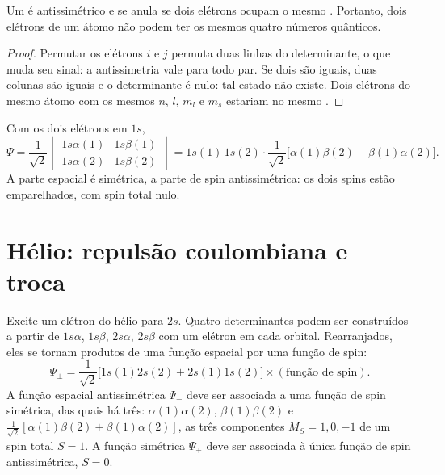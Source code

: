 \begin{theorem}\label{thm:b3:many-electron-atoms:pauli}
Um  é antissimétrico e se anula se dois elétrons
ocupam o mesmo . Portanto, dois elétrons de um átomo não podem
ter os mesmos quatro números quânticos.
\end{theorem}

\begin{proof}
Permutar os elétrons $i$ e $j$ permuta duas linhas do determinante, o que
muda seu sinal: a antissimetria vale para todo par. Se dois 
são iguais, duas colunas são iguais e o determinante é nulo: tal estado não
existe. Dois elétrons do mesmo átomo com os mesmos $n$, $l$, $m_l$ e $m_s$
estariam no mesmo .
\end{proof}

\begin{example}\label{ex:b3:many-electron-atoms:helium-ground}
Com os dois elétrons em $1s$,
\[
\Psi = \frac{1}{\sqrt2}\begin{vmatrix}1s\alpha(1) & 1s\beta(1)\\ 1s\alpha(2) &
1s\beta(2)\end{vmatrix} = 1s(1)\,1s(2)\cdot\frac{1}{\sqrt2}\big[\alpha(1)\beta(2)
- \beta(1)\alpha(2)\big].
\]
A parte espacial é simétrica, a parte de spin antissimétrica: os dois spins
estão emparelhados, com spin total nulo.
\end{example}

\section{Hélio: repulsão coulombiana e troca}

Excite um elétron do hélio para $2s$. Quatro determinantes podem ser
construídos a partir de $1s\alpha$, $1s\beta$, $2s\alpha$, $2s\beta$ com um
elétron em cada orbital. Rearranjados, eles se tornam produtos de uma função
espacial por uma função de spin:
\[
\Psi_\pm = \frac{1}{\sqrt2}\big[1s(1)2s(2) \pm 2s(1)1s(2)\big]\times(\text{função
de spin}).
\]
A função espacial antissimétrica $\Psi_-$ deve ser associada a uma função de
spin simétrica, das quais há três: $\alpha(1)\alpha(2)$,
$\beta(1)\beta(2)$ e $\frac{1}{\sqrt2}[\alpha(1)\beta(2) + \beta(1)\alpha(2)]$, as
três componentes $M_S = 1, 0, -1$ de um spin total $S = 1$. A função simétrica
$\Psi_+$ deve ser associada à única função de spin antissimétrica, $S = 0$.

